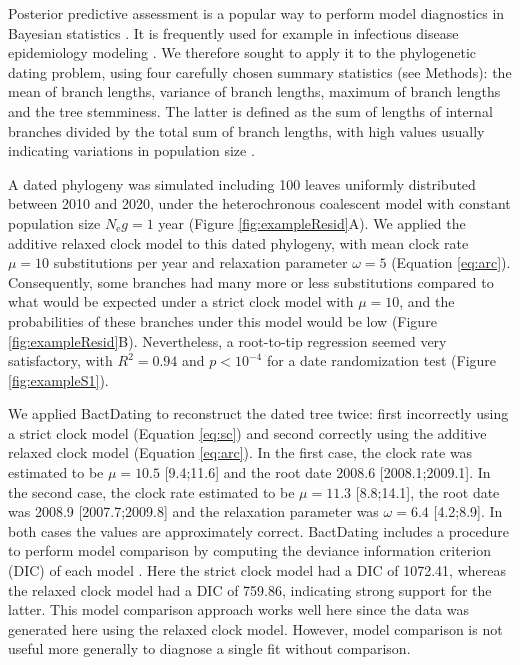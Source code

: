 \documentclass{article}
\begin{document}
Posterior predictive assessment is a popular way to perform
model diagnostics in Bayesian statistics \citep{Meng1994,Gelman1996}.
It is frequently used for example in infectious disease epidemiology modeling \citep{Didelot2017b,Whittles2017,gibsonComparisonAssessmentEpidemic2018}.
We therefore sought to apply it to the phylogenetic dating problem, using 
four carefully chosen summary statistics (see Methods): the mean of branch lengths,
variance of branch lengths, maximum of branch lengths and the tree stemminess.
The latter is defined as the sum of lengths of 
internal branches divided by the total sum of branch lengths, with high values usually indicating
variations in population size \citep{fialaFactorsDeterminingAccuracy1985,Didelot2009d}.

A dated phylogeny was simulated including 100 leaves uniformly distributed between 2010 and 2020, 
under the heterochronous coalescent model \citep{Drummond2002}
with constant population size $N_\mathrm{e}g=1$ year (Figure \ref{fig:exampleResid}A). 
We applied the additive relaxed clock model \citep{Didelot2021} to this dated phylogeny,
with mean clock rate $\mu=10$ substitutions per year and relaxation parameter $\omega=5$ (Equation \ref{eq:arc}).
Consequently, some branches had many more or less substitutions compared to what would be expected
under a strict clock model with $\mu=10$, and the probabilities of these branches
under this model would be low (Figure \ref{fig:exampleResid}B). Nevertheless, a root-to-tip regression seemed
very satisfactory, with $R^2=0.94$ and $p<10^{-4}$ for 
a date randomization test (Figure \ref{fig:exampleS1}).

We applied BactDating \citep{Didelot2018} to reconstruct the dated tree twice: first 
incorrectly using a strict clock model (Equation \ref{eq:sc}) and second
correctly using the additive relaxed clock model (Equation \ref{eq:arc}).
In the first case, the clock rate was estimated to be $\mu=10.5$ [9.4;11.6] and the root date 
2008.6 [2008.1;2009.1].
In the second case, the clock rate estimated to be $\mu=11.3$ [8.8;14.1], 
the root date was 2008.9 [2007.7;2009.8]
and the relaxation parameter was $\omega=6.4$ [4.2;8.9]. 
In both cases the values are approximately correct. 
BactDating includes a procedure to perform model comparison by computing
the deviance information criterion (DIC) of each model \citep{Spiegelhalter2002}.
Here the strict clock model had a DIC of 1072.41, whereas the relaxed clock model
had a DIC of 759.86, indicating strong support for the latter. 
This model comparison approach works well here 
since the data was generated here using the relaxed clock model.
However, model comparison is not useful 
more generally to diagnose a single fit without comparison.
\end{document}
